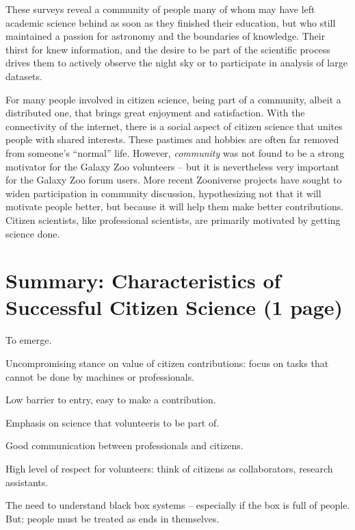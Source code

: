 \documentclass{ar2e}
\begin{document}
These surveys reveal a community of people many of whom may have left  
academic science behind as soon as they finished their  education, but who
still maintained a passion for astronomy and the  boundaries of knowledge. 
Their thirst for knew information, and the  desire to be part of the 
scientific process drives them to actively observe the  night sky or to
participate in analysis of large datasets.  

For many people involved in citizen science, being part of a community, 
albeit a distributed one, that brings great enjoyment and satisfaction.  With
the connectivity of the internet, there is a social  aspect of citizen science
that unites people with shared interests.   These pastimes and hobbies are
often far removed from someone's ``normal''  life. However, {\it community}
was not found to be a strong motivator for the Galaxy Zoo volunteers -- but it
is nevertheless very important for the Galaxy Zoo forum users. More recent
Zooniverse projects have sought to widen participation in community
discussion, hypothesizing not that it will motivate people better, but because
it will help them make better contributions. Citizen scientists, like
professional scientists, are primarily motivated by getting science done.



\section{Summary: Characteristics of Successful Citizen Science (1 page)}
\label{sec:summary}

To emerge.

Uncompromising stance on value of citizen contributions: focus on tasks that
cannot be done by machines or professionals.

Low barrier to entry, easy to make a contribution.

Emphasis on science that volunteeris to be part of. 

Good communication between professionals and citizens.

High level of respect for volunteers: think of citizens as collaborators,
research assistants.

The need to understand black box systems -- especially if the box is full of
people. But: people must be treated as ends in themselves. 

\end{document}
